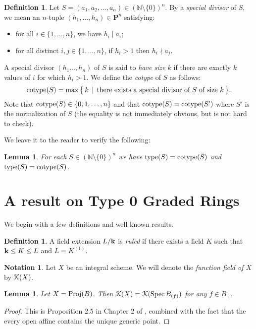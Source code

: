 \documentclass[12pt]{amsart}
\theoremstyle{plain}
\newtheorem{lemma}[subsection]{Lemma}
\theoremstyle{definition}
\newtheorem{definition}[subsection]{Definition}
\newtheorem{notation}[subsection]{Notation}
\newcommand{\Spec}{		\operatorname{{\rm Spec}}}
\newcommand{\Proj}{		\operatorname{{\rm Proj}}}
\newcommand{\type}{		\operatorname{{\rm type}}}
\newcommand{\cotype}{		\operatorname{{\rm cotype}}}
\newcommand{\setspec}[2]{\big\{\,#1\, \mid \,#2\, \big\}}
\newcommand{\Nat}{\ensuremath{\mathbb{N}}}
\newcommand{\bk}{{\ensuremath{\rm \bf k}}}
\newcommand{\Keul}{\EuScript{K}}
\begin{document}
\begin{definition}
Let $S = (a_1, a_2, ..., a_n) \in (\Nat \setminus \{0\})^n$.
By a \textit{special divisor} of $S$, we mean an $n$-tuple $(h_1, \dots, h_n) \in \mathbf{P}^n$ satisfying:
\begin{itemize}

\item  for all $i \in \{1, \dots, n\}$, we have $h_i \mid a_i$;

\item for all distinct $i,j \in \{1,\dots,n\}$, if $h_i>1$ then $h_i \nmid a_j$.

\end{itemize}
A special divisor $(h_1 \dots, h_n)$ of $S$ is said to \textit{have size $k$}
if there are exactly $k$ values of $i$ for which $h_i>1$.
We define the \textit{cotype} of $S$ as follows:
$$
\cotype(S) =  \max \setspec{ k }{ \text{there exists a special divisor of $S$ of size $k$} }.
$$
Note that $\cotype(S) \in \{0,1,\dots,n\}$ and that $\cotype(S) = \cotype(S')$ where $S'$ is the normalization of $S$
(the equality is not immediately obvious, but is not hard to check).
\end{definition}


We leave it to the reader to verify the following:

\begin{lemma} \label {equivalentType2}
For each $S \in (\Nat\setminus\{0\})^n$ we have
$\type(S) = \cotype( \bar S )$ and $\type(\bar S) = \cotype( S )$.
\end{lemma}




\section{A result on Type 0 Graded Rings}

We begin with a few definitions and well known results. 

\begin{definition}
	A field extension $L / \bk$ is \textit{ruled} if there exists a field $K$ such that $\bk \leq K \leq L$ and $L = K^{(1)}$.  
\end{definition}

\begin{notation} Let $X$ be an integral scheme. We will denote the \textit{function field of $X$} by $\Keul(X)$.
\end{notation}

\begin{lemma}\label{ffIrrelevant} Let $X = \Proj(B)$. Then $\Keul(X) = \Keul(\Spec B_{(f)})$ for any $f \in B_+$. 
\end{lemma}
\begin{proof}
	This is Proposition 2.5 in Chapter 2 of \cite{Hartshorne}, combined with the fact that the every open affine contains the unique generic point. 
\end{proof}
\end{document}
